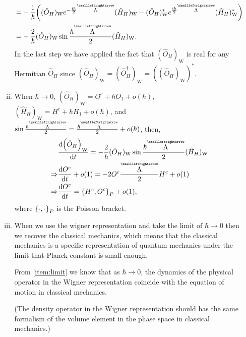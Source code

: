 \documentclass{article}
\newcommand{\iu}{\ensuremath{\mathrm{i}}}
\newcommand{\tensor}[1]{\overset{\scriptscriptstyle\smallleftrightarrow}{#1}}
\begin{document}
\begin{enumerate}[1.]
\begin{enumerate}[(i)]
\begin{align*}
      =& -\frac{\iu}{\hbar}\qty((\hat{O}_H)_\mathrm{W} e^{-\frac{\iu\hbar}{2}\tensor{\Lambda}} (\hat{H}_H)_\mathrm{W} - (\hat{O}_H)_\mathrm{W}^* e^{\frac{\iu\hbar}{2}\tensor{\Lambda}} (\hat{H}_H)_\mathrm{W}^*)\\
      =& -\frac{2}{\hbar}(\hat{O}_H)_\mathrm{W} \sin{\frac{\hbar\tensor{\Lambda}}{2}} (\hat{H}_H)_\mathrm{W}.
    \end{align*}
    In the last step we have applied the fact that $(\hat{O}_H)_\mathrm{W}$ is real for any
    Hermitian $\hat{O}_H$ since $(\hat{O}_H)_\mathrm{W} = (\hat{O}_H^\dagger)_\mathrm{W} = ((\hat{O}_H)_\mathrm{W})^*$.
    \item\label{item:limit} When $\hbar \to 0$, $(\hat{O}_H)_\mathrm{W} = O^c + \hbar O_1 + o(\hbar)$, $(\hat{H}_H)_\mathrm{W} = H^c + \hbar H_1 + o(\hbar)$, and $\sin {\frac{\hbar\tensor{\Lambda}}{2}} = \frac{\hbar\tensor{\Lambda}}{2} + o(\hbar)$, then,
    \begin{align*}
     & \dv{\qty(\hat{O}_H)_\mathrm{W}}{t} = -\frac{2}{\hbar}(\hat{O}_H)_\mathrm{W} \sin{\frac{\hbar\tensor{\Lambda}}{2}} (\hat{H}_H)_\mathrm{W}\\
     \Rightarrow & \dv{O^c}{t} + o(1) = -2O^c\frac{\tensor{\Lambda}}{2} H^c + o(1) \\
     \Rightarrow & \dv{O^c}{t} = \acomm{H^c}{O^c}_P + o(1),
    \end{align*} 
    where $\acomm{\cdot}{\cdot}_P$ is the Poisson bracket.
    \item When we use the wigner representation and take the limit of $\hbar \to 0$ then we recover the classical mechanics, which means that the classical mechanics is a specific representation of quantum mechanics under the limit that Planck constant is small enough.
    
    From \ref{item:limit} we know that as $\hbar \to 0$, the dynamics of the physical operator in the Wigner representation coincide with the equation of motion in classical mechanics.

    (The density operator in the Wigner representation should has the same formalism of the volume element in the phase space in classical mechanics.)
  \end{enumerate}


\end{enumerate}
\end{document}
